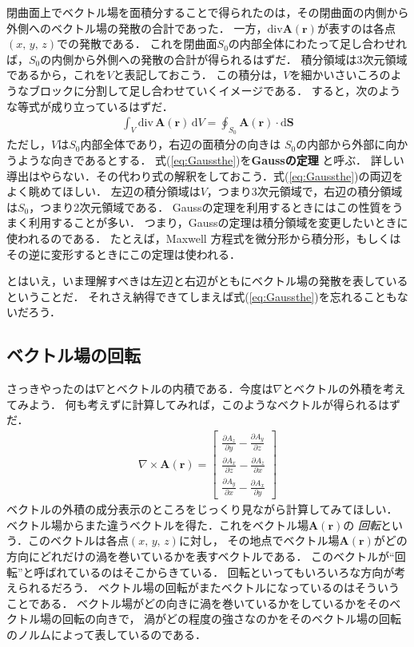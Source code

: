 閉曲面上でベクトル場を面積分することで得られたのは，その閉曲面の内側から外側へのベクトル場の発散の合計であった．
一方，$\mathrm{div}\bm{A}(\bm{r})$が表すのは各点$(x, \, y, \, z)$での発散である．
これを閉曲面$S_0$の内部全体にわたって足し合わせれば，$S_0$の内側から外側への発散の合計が得られるはずだ．
積分領域は3次元領域であるから，これを$V$と表記しておこう．
この積分は，$V$を細かいさいころのようなブロックに分割して足し合わせていくイメージである． 
すると，次のような等式が成り立っているはずだ．
\begin{eqnarray}
\int_V \mathrm{div} \, \bm{A}(\bm{r}) \, \mathrm{d}V = \oint_{S_0} \bm{A}(\bm{r}) \cdot \mathrm{d}\bm{S}
\label{eq:Gaussthe}
\end{eqnarray}
ただし，$V$は$S_0$内部全体であり，右辺の面積分の向きは
$S_0$の内部から外部に向かうような向きであるとする．
式(\ref{eq:Gaussthe})を\textbf{Gaussの定理}
と呼ぶ．
詳しい導出はやらない．その代わり式の解釈をしておこう．式(\ref{eq:Gaussthe})の両辺をよく眺めてほしい．
左辺の積分領域は$V$，つまり3次元領域で，右辺の積分領域は$S_0$，つまり2次元領域である．
Gaussの定理を利用するときにはこの性質をうまく利用することが多い．
つまり，Gaussの定理は積分領域を変更したいときに使われるのである．
たとえば，Maxwell
方程式を微分形から積分形，もしくはその逆に変形するときにこの定理は使われる．

とはいえ，いま理解すべきは左辺と右辺がともにベクトル場の発散を表しているということだ．
それさえ納得できてしまえば式(\ref{eq:Gaussthe})を忘れることもないだろう．
\subsection{ベクトル場の回転}
さっきやったのは$\nabla$とベクトルの内積である．今度は$\nabla$とベクトルの外積を考えてみよう．
何も考えずに計算してみれば，このようなベクトルが得られるはずだ．
\begin{eqnarray}
\nabla \times \bm{A}(\bm{r}) = \left[
\begin{array}{c}
\displaystyle
\frac{\partial A_z}{\partial y} - \frac{\partial A_y}{\partial z} \\
\displaystyle
\frac{\partial A_x}{\partial z} - \frac{\partial A_z}{\partial x} \\
\displaystyle
\frac{\partial A_y}{\partial x} - \frac{\partial A_x}{\partial y} 
\end{array}
\right]
\label{eq:rotnabla}
\end{eqnarray}
ベクトルの外積の成分表示のところをじっくり見ながら計算してみてほしい．
ベクトル場からまた違うベクトルを得た．これをベクトル場$\bm{A}(\bm{r})$の
\emph{回転}という．このベクトルは各点$(x, \, y, \, z)$に対し，
その地点でベクトル場$\bm{A}(\bm{r})$がどの方向にどれだけの渦を巻いているかを表すベクトルである．
このベクトルが``回転''と呼ばれているのはそこからきている．
回転といってもいろいろな方向が考えられるだろう．
ベクトル場の回転がまたベクトルになっているのはそういうことである．
ベクトル場がどの向きに渦を巻いているかをしているかをそのベクトル場の回転の向きで，
渦がどの程度の強さなのかをそのベクトル場の回転のノルムによって表しているのである．

